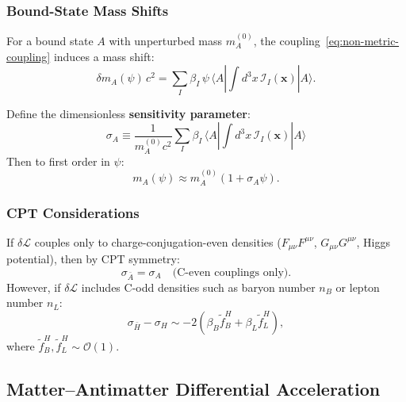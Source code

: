 \subsubsection{Bound-State Mass Shifts}

For a bound state $A$ with unperturbed mass $m_A^{(0)}$, the coupling~\eqref{eq:non-metric-coupling} 
induces a mass shift:
\begin{equation}
\delta m_A(\psi)\,c^2 = \sum_I \beta_I\,\psi\,\langle A|\int d^3x\,\mathcal{I}_I(\mathbf{x})|A\rangle.
\label{eq:mass-shift}
\end{equation}

Define the dimensionless \textbf{sensitivity parameter}:
\begin{equation}
\boxed{
\sigma_A \equiv \frac{1}{m_A^{(0)}c^2}\sum_I \beta_I\,\langle A|\int d^3x\,\mathcal{I}_I(\mathbf{x})|A\rangle
}
\label{eq:sigma-definition}
\end{equation}
Then to first order in $\psi$:
\begin{equation}
m_A(\psi) \approx m_A^{(0)}(1 + \sigma_A\psi).
\label{eq:mass-psi-dependence}
\end{equation}

\subsubsection{CPT Considerations}

\begin{remark}\label{rem:cpt}
If $\delta\mathcal{L}$ couples only to charge-conjugation-even densities 
($F_{\mu\nu}F^{\mu\nu}$, $G_{\mu\nu}G^{\mu\nu}$, Higgs potential), then by 
CPT symmetry:
\begin{equation}
\sigma_{\bar{A}} = \sigma_A \quad \text{(C-even couplings only)}.
\end{equation}
However, if $\delta\mathcal{L}$ includes C-odd densities such as baryon 
number $n_B$ or lepton number $n_L$:
\begin{equation}
\sigma_{\bar{H}} - \sigma_H \sim -2(\beta_B\tilde{f}_B^H + \beta_L\tilde{f}_L^H),
\end{equation}
where $\tilde{f}_B^H, \tilde{f}_L^H \sim \mathcal{O}(1)$.
\end{remark}

\subsection{Matter--Antimatter Differential Acceleration}\label{sec:antimatter-diff}

